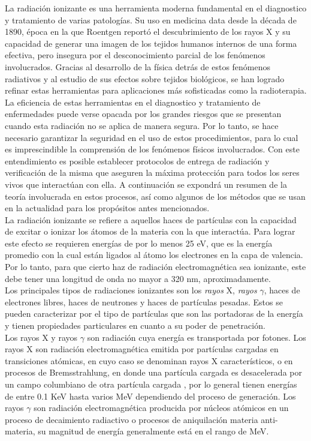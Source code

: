 La radiación ionizante es una herramienta moderna fundamental en el diagnostico y tratamiento de varias patologías. Su uso en medicina data desde la década de 1890, época en la que Roentgen reportó el descubrimiento de los rayos X y su capacidad de generar una imagen de los tejidos humanos internos de una forma efectiva, pero insegura por el desconocimiento parcial de los fenómenos involucrados. Gracias al desarrollo de la física detrás de estos fenómenos radiativos y al estudio de sus efectos sobre tejidos biológicos, se han logrado refinar estas herramientas para aplicaciones más sofisticadas como la radioterapia.\\

La eficiencia de estas herramientas en el diagnostico y tratamiento de enfermedades puede verse opacada por los grandes riesgos que se presentan cuando esta radiación no se aplica de manera segura. Por lo tanto, se hace necesario garantizar la seguridad en el uso de estos procedimientos, para lo cual es imprescindible la comprensión de los fenómenos físicos involucrados. Con este entendimiento es posible establecer protocolos de entrega de radiación y verificación de la misma que aseguren la máxima protección para todos los seres vivos que interactúan con ella. A continuación se expondrá un resumen de la teoría involucrada en estos procesos, así como algunos de los métodos que se usan en la actualidad para los propósitos antes mencionados.  \\

La radiación ionizante se refiere a aquellos haces de partículas con la capacidad de excitar o ionizar los átomos de la materia con la que interactúa. Para lograr este efecto se requieren energías de por lo menos 25 eV, que es la energía promedio con la cual están ligados al átomo los electrones en la capa de valencia. Por lo tanto, para que cierto haz de radiación electromagnética sea ionizante, este debe tener una longitud de onda no mayor a 320 nm, aproximadamente. \\

Los principales tipos de radiaciones ionizantes son los \textit{rayos} X, \textit{rayos }$\gamma$, haces de electrones libres, haces de neutrones y haces de partículas pesadas. Estos se pueden caracterizar por el tipo de partículas que son las portadoras de la energía y tienen propiedades particulares en cuanto a su poder de penetración.\\

Los rayos X y rayos $\gamma$ son radiación cuya energía es transportada por fotones. Los rayos X son radiación electromagnética emitida por partículas cargadas en transiciones atómicas, en cuyo caso se denominan rayos X característicos, o en procesos de Bremsstrahlung, en donde una partícula cargada es desacelerada por un campo columbiano de otra partícula cargada , por lo general tienen energías de entre  0.1 KeV hasta varios MeV dependiendo del proceso de generación. Los rayos $\gamma$ son radiación electromagnética producida por núcleos atómicos en un proceso de decaimiento radiactivo o procesos de aniquilación materia anti-materia, su magnitud de energía generalmente está en el rango de MeV.\\

